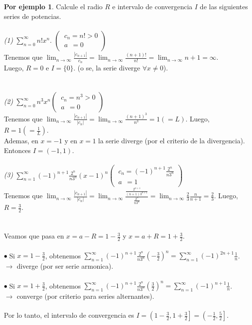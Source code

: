 \documentclass{article}
\theoremstyle{definition}
\newtheorem*{ej}{Por ejemplo}
\theoremstyle{remark}
\newcommand\bl{$\bullet\;$}
\begin{document}
\begin{ej}
  Calcule el radio $R$ e intervalo de convergencia $I$ de las siguientes series de potencias. \\ \\ 
\emph{(1)} $\sum_{n=0}^{\infty}{n!x^n}$. \quad \quad $\left(\
  \begin{array}{l}
c_n=n! > 0 \\ 
a\phantom{_n}=0
  \end{array}
  \right)$ \\
Tenemos que $\lim_{n\to\infty}{\frac{|c_{n+1}|}{c_n}}=\lim_{n\to\infty}{\frac{(n+1)!}{n!}}=\lim_{n\to\infty}{n+1}=\infty.$ \\Luego, $R=0$ e $I=\{0\}$. (o se, la serie diverge $\forall x \neq 0$). \\ \\ \\ 
\emph{(2)} $\sum_{n=0}^{\infty}{n^3x^n}$\quad \quad $\left(\
  \begin{array}{l}
    c_n=n^3 > 0 \\ 
a\phantom{_n}=0
  \end{array}
  \right)$ \\
  Tenemos que $\lim_{n\to\infty}{\frac{|c_{n+1}|}{|c_n|}}=\lim_{n\to\infty}{\frac{(n+1)^3}{n^3}}=1(=L)$. Luego, $R=1(=\frac{1}{L})$. \\
  Ademas, en $x=-1$ y en $x=1$ la serie diverge (por el criterio de la divergencia). \\
  Entonces $I=(-1,1).$
\\ \\
\emph{(3)} $\sum_{n=1}^{\infty}{(-1)^{n+1}\frac{2^n}{n3^n}(x-1)^n}$\quad \quad $\left(\
  \begin{array}{l}
    c_n=(-1)^{n+1}\frac{2^n}{n3^n} \\ 
a\phantom{_n}=1
  \end{array}
  \right)$ \\
  Tenemos que $\lim_{n\to\infty}{\frac{|c_{n+1}|}{|c_n|}}
=
\lim_{n\to\infty}{\frac{\frac{2^{n+1}}{(n+1)3^{n+1}}}{\frac{2^n}{n3^n}}}
=
\lim_{n\to\infty}{\frac{2}{3}\frac{n}{n+1}}
=
\frac{2}{3}$. Luego, $R=\frac{3}{2}.$
\\
\\
\\
Veamos que pasa en $x=a-R=1-\frac{3}{2}$\; y \;$x=a+R=1+\frac{3}{2}$. \\\\
\bl Si $x=1-\frac{3}{2}$, obtenemos $\sum_{n=1}^{\infty}{(-1)^{n+1}{\frac{2^n}{n3^n}\left(-\frac{3}{2}\right)^n}}=\sum_{n=1}^{\infty}{(-1)^{2n+1}\frac{1}{n}}$. \\ $\longrightarrow$ diverge (por ser serie armonica). \\ 
\\
\bl Si $x=1+\frac{3}{2}$, obtenemos $\sum_{n=1}^{\infty}{(-1)^{n+1}\frac{2^n}{n3^n}\left(\frac{3}{2}\right)^n}=\sum_{n=1}^{\infty}{(-1)^{n+1}\frac{1}{n}}$. \\ $\longrightarrow$ converge (por criterio para series alternantes). \\ \\ 
Por lo tanto, el intervalo de convergencia es $I=\left(1-\frac{3}{2},1+\frac{3}{2}\right]=\left(-\frac{1}{2},\frac{5}{2}\right]$. 
\end{ej}
\end{document}
